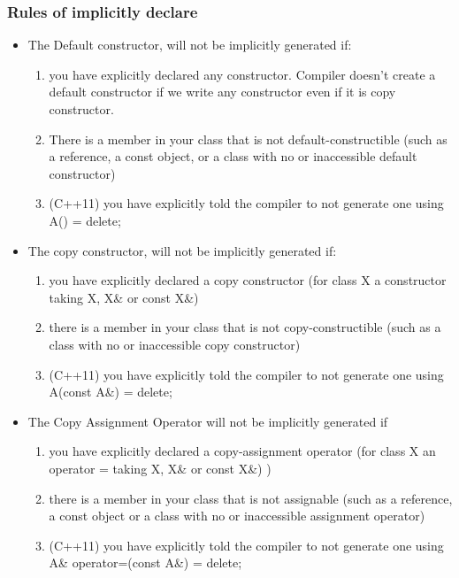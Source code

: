 \documentclass[a4paper,11pt,twoside]{book}
\begin{document}
\subsubsection{Rules of implicitly declare }
\begin{itemize}
	\item The Default constructor, will not be implicitly generated if:
	
\begin{enumerate}
	\item you have explicitly declared any constructor.  Compiler doesn't create a default constructor if we write any constructor even if it is copy constructor.

	\item There is a member in your class that is not default-constructible (such as a reference, a const object, or a class with no or inaccessible default constructor)

	\item (C++11) you have explicitly told the compiler to not generate one using A() = delete;
\end{enumerate}

\item The copy constructor, will not be implicitly generated if:
\begin{enumerate}
	\item you have explicitly declared a copy constructor (for class X a constructor taking X, X\& or const X\&)
	
	\item there is a member in your class that is not copy-constructible (such as a class with no or inaccessible copy constructor)
	
	\item (C++11) you have explicitly told the compiler to not generate one using A(const A\&) = delete;
\end{enumerate}


\item The Copy Assignment Operator will not be implicitly generated if
\begin{enumerate}
\item you have explicitly declared a copy-assignment operator (for class X an operator = taking X, X\& or const X\&) )
\item there is a member in your class that is not assignable (such as a reference, a const object or a class with no or inaccessible assignment operator)
\item (C++11) you have explicitly told the compiler to not generate one using A\& operator=(const A\&) = delete;
\end{enumerate}



\end{itemize}
\end{document}

